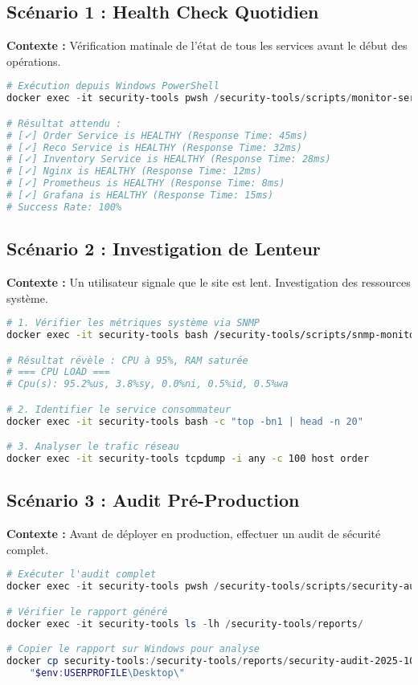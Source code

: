 \subsection{Scénario 1 : Health Check Quotidien}
\textbf{Contexte :} Vérification matinale de l'état de tous les services avant le début des opérations.

\begin{lstlisting}[language=PowerShell, caption=Commande de Check Quotidien]
# Exécution depuis Windows PowerShell
docker exec -it security-tools pwsh /security-tools/scripts/monitor-services.ps1

# Résultat attendu :
# [✓] Order Service is HEALTHY (Response Time: 45ms)
# [✓] Reco Service is HEALTHY (Response Time: 32ms)
# [✓] Inventory Service is HEALTHY (Response Time: 28ms)
# [✓] Nginx is HEALTHY (Response Time: 12ms)
# [✓] Prometheus is HEALTHY (Response Time: 8ms)
# [✓] Grafana is HEALTHY (Response Time: 15ms)
# Success Rate: 100%
\end{lstlisting}

\subsection{Scénario 2 : Investigation de Lenteur}
\textbf{Contexte :} Un utilisateur signale que le site est lent. Investigation des ressources système.

\begin{lstlisting}[language=bash, caption=Analyse des Performances Système]
# 1. Vérifier les métriques système via SNMP
docker exec -it security-tools bash /security-tools/scripts/snmp-monitor.sh

# Résultat révèle : CPU à 95%, RAM saturée
# === CPU LOAD ===
# Cpu(s): 95.2%us, 3.8%sy, 0.0%ni, 0.5%id, 0.5%wa

# 2. Identifier le service consommateur
docker exec -it security-tools bash -c "top -bn1 | head -n 20"

# 3. Analyser le trafic réseau
docker exec -it security-tools tcpdump -i any -c 100 host order
\end{lstlisting}

\subsection{Scénario 3 : Audit Pré-Production}
\textbf{Contexte :} Avant de déployer en production, effectuer un audit de sécurité complet.

\begin{lstlisting}[language=PowerShell, caption=Audit de Sécurité Complet]
# Exécuter l'audit complet
docker exec -it security-tools pwsh /security-tools/scripts/security-audit.ps1

# Vérifier le rapport généré
docker exec -it security-tools ls -lh /security-tools/reports/

# Copier le rapport sur Windows pour analyse
docker cp security-tools:/security-tools/reports/security-audit-2025-10-20_10-30-45.txt `
    "$env:USERPROFILE\Desktop\"
\end{lstlisting}

